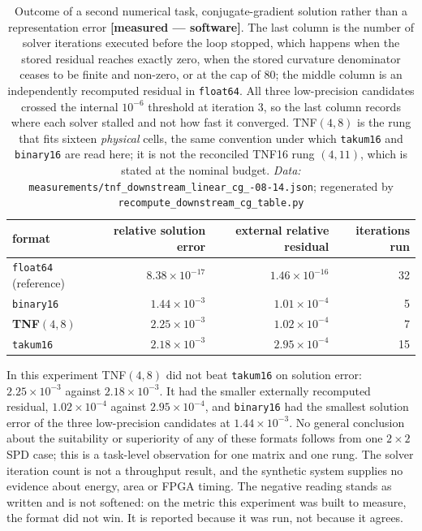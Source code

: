 \begin{table}[t]\centering\small
\caption{Outcome of a second numerical task, conjugate-gradient solution rather
than a representation error \textbf{[measured --- software]}. The last column is
the number of solver iterations executed before the loop stopped, which happens when
the stored residual reaches exactly zero, when the stored curvature denominator
ceases to be finite and non-zero, or at the cap of $80$; the middle column is an
independently recomputed residual in \texttt{float64}. All three low-precision
candidates crossed the internal $10^{-6}$ threshold at iteration 3, so the last
column records where each solver stalled and not how fast it converged.
TNF$(4,8)$ is the rung that fits sixteen \emph{physical} cells, the same
convention under which \texttt{takum16} and \texttt{binary16} are read here; it
is not the reconciled TNF16 rung $(4,11)$, which is stated at the nominal
budget. \emph{Data:} \texttt{measurements/\allowbreak tnf\_\allowbreak downstream\_\allowbreak linear\_\allowbreak cg\_-08-14.json}; regenerated by \texttt{recompute\_\allowbreak downstream\_\allowbreak cg\_\allowbreak table.py}}
\label{tab:downstream-cg}
\begin{tabular}{lrrr}
\toprule
format & relative solution error & external relative residual & iterations run \\
\midrule
\texttt{float64} (reference) & $8.38\times10^{-17}$ & $1.46\times10^{-16}$ & 32 \\
\texttt{binary16}            & $1.44\times10^{-3}$  & $1.01\times10^{-4}$  & 5  \\
\textbf{TNF$(4,8)$}          & $2.25\times10^{-3}$  & $1.02\times10^{-4}$  & 7  \\
\texttt{takum16}             & $2.18\times10^{-3}$  & $2.95\times10^{-4}$  & 15 \\
\bottomrule
\end{tabular}
\end{table}

In this experiment TNF$(4,8)$ did not beat \texttt{takum16} on solution error:
$2.25\times10^{-3}$ against $2.18\times10^{-3}$. It had the smaller externally
recomputed residual, $1.02\times10^{-4}$ against $2.95\times10^{-4}$, and
\texttt{binary16} had the smallest solution error of the three low-precision
candidates at $1.44\times10^{-3}$. No general conclusion about the suitability or
superiority of any of these formats follows from one $2\times2$ SPD case; this is a
task-level observation for one matrix and one rung. The solver iteration count is
not a throughput result, and the synthetic system supplies no evidence about
energy, area or FPGA timing. The negative reading stands as written and is not
softened: on the metric this experiment was built to measure, the format did not
win. It is reported because it was run, not because it agrees.

